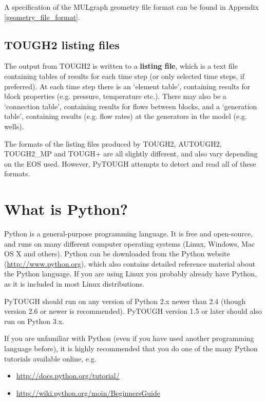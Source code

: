 A specification of the MULgraph geometry file format can be found in Appendix \ref{geometry_file_format}.

\subsection{TOUGH2 listing files}

The output from TOUGH2 is written to a \textbf{listing file}, which is a text file containing tables of results for each time step (or only selected time steps, if preferred).  At each time step there is an `element table', containing results for block properties (e.g. pressure, temperature etc.).  There may also be a `connection table', containing results for flows between blocks, and a `generation table', containing results (e.g. flow rates) at the generators in the model (e.g. wells).

The formats of the listing files produced by TOUGH2, AUTOUGH2, TOUGH2\_MP and TOUGH+ are all slightly different, and also vary depending on the EOS used.  However, PyTOUGH attempts to detect and read all of these formats.

\section{What is Python?}

Python is a general-purpose programming language.  It is free and open-source, and runs on many different computer operating systems (Linux, Windows, Mac OS X and others).  Python can be downloaded from the Python website (\url{http://www.python.org}), which also contains detailed reference material about the Python language.  If you are using Linux you probably already have Python, as it is included in most Linux distributions.

PyTOUGH should run on any version of Python 2.x newer than 2.4 (though version 2.6 or newer is recommended). PyTOUGH version 1.5 or later should also run on Python 3.x.

If you are unfamiliar with Python (even if you have used another programming language before), it is highly recommended that you do one of the many Python tutorials available online, e.g.

\begin{itemize}
  \item \url{http://docs.python.org/tutorial/}
  \item \url{http://wiki.python.org/moin/BeginnersGuide}
\end{itemize}

